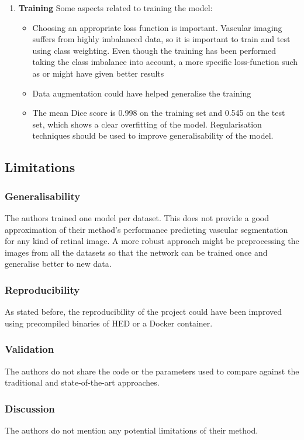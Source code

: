 \begin{enumerate}
  \item \textbf{Training} Some aspects related to training the model:
    \begin{itemize}
      \item Choosing an appropriate loss function is important. Vascular imaging suffers from highly imbalanced data, so it is important to train and test using class weighting. Even though the training has been performed taking the class imbalance into account, a more specific loss-function such as \cite{sudre_generalised_2017} or \cite{fidon_generalised_2018} might have given better results
      \item Data augmentation could have helped generalise the training
      \item The mean Dice score is 0.998 on the training set and 0.545 on the test set, which shows a clear overfitting of the model. Regularisation techniques should be used to improve generalisability of the model.
    \end{itemize}
\end{enumerate}


\subsection{Limitations}

\subsubsection{Generalisability}
The authors trained one model per dataset. This does not provide a good approximation of their method's performance predicting vascular segmentation for any kind of retinal image. A more robust approach might be preprocessing the images from all the datasets so that the network can be trained once and generalise better to new data.

\subsubsection{Reproducibility}
As stated before, the reproducibility of the project could have been improved using precompiled binaries of HED or a Docker container.

\subsubsection{Validation}
The authors do not share the code or the parameters used to compare against the traditional and state-of-the-art approaches.

\subsubsection{Discussion}
The authors do not mention any potential limitations of their method.


